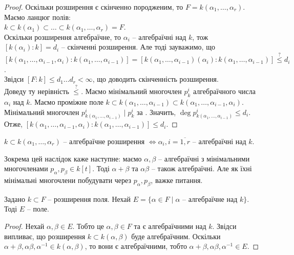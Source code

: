 \documentclass{math_library}
\begin{document}
\begin{proof}
Оскільки розширення є скінченно породженим, то $F = k(\alpha_1,\dots,\alpha_r)$. Маємо ланцюг полів: \\
$k \subset k(\alpha_1) \subset \dots \subset k(\alpha_1,\dots,\alpha_r) = F$.\\
Оскільки розширення алгебраїчне, то $\alpha_i$ -- алгебраїчні над $k$, тож $[k(\alpha_i):k] = d_i$ -- скінченні розширення. Але тоді зауважимо, що \\ $[k(\alpha_1,\dots,\alpha_{i-1},\alpha_i) : k(\alpha_1,\dots,\alpha_{i-1})] = [k(\alpha_1,\dots,\alpha_{i-1})(\alpha_i) : k(\alpha_1,\dots,\alpha_{i-1})] \overset{?}{\leq} d_i$.\\
Звідси $[F:k] \leq d_1 \dots d_r < \infty$, що доводить скінченність розширення.
\bigskip \\
Доведу ту нерівність $\overset{?}{\leq}$. Маємо мінімальний многочлен $p^i_k$ алгебраїчного числа $\alpha_i$ над $k$. Маємо проміжне поле $k \subset k(\alpha_1,\dots,\alpha_{i-1}) \subset k(\alpha_1,\dots,\alpha_{i-1},\alpha_i)$. Мінімальний многочлен $p^i_{k(\alpha_1,\dots,\alpha_{i-1})} \mid p^i_{k}$ за . Значить, $\deg p^i_{k(\alpha_1,\dots,\alpha_{i-1})} \leq d_i$. Отже, $[k(\alpha_1,\dots,\alpha_{i-1},\alpha_i) : k(\alpha_1,\dots,\alpha_{i-1})] \leq d_i$.
\end{proof}

\begin{corollary}
$k \subset k(\alpha_1,\dots,\alpha_r)$ -- алгебраїчне розширення $\iff \alpha_i , i =\overline{1,r}$ -- алгебраїчні над $k$.
\end{corollary}

Зокрема цей наслідок каже наступне: маємо $\alpha, \beta$ -- алгебраїчні з мінімальними многочленами $p_\alpha, p_\beta \in k[t]$. Тоді $\alpha+\beta$ та $\alpha \beta$ -- також алгебраїчні. Але як їхні мінімальні многочлени побудувати через $p_\alpha, p_\beta$, важке питання.

\begin{proposition}
Задано $k \subset F$ -- розширення поля. Нехай $E = \{\alpha \in F \mid \alpha \text{ -- алгебраїчне над } k \}$. Тоді $E$ -- поле.
\end{proposition}

\begin{proof}
Нехай $\alpha,\beta \in E$. Тобто це $\alpha,\beta \in F$ та є алгебраїчними над $k$. Звідси випливає, що розширення $k \subset k(\alpha,\beta)$ буде алгебраїчним. Оскільки $\alpha+\beta, \alpha \beta, \alpha^{-1} \in k(\alpha,\beta)$, то вони є алгебраїчними, тобто $\alpha+\beta, \alpha \beta, \alpha^{-1} \in E$.
\end{proof}
\end{document}
